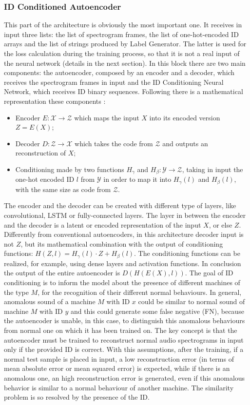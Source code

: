\subsubsection{ID Conditioned Autoencoder}
This part of the architecture is obviously the most important one. It receives in input three lists: the list of spectrogram frames, the list of one-hot-encoded ID arrays and the list of strings produced by Label Generator. The latter is used for the loss calculation during the training process, so that it is not a real input of the neural network (details in the next section). In this block there are two main components: the autoencoder, composed by an encoder and a decoder, which receives the spectrogram frames in input and the ID Conditioning Neural Network, which receives ID binary sequences. Following there is a mathematical representation these components \cite{18IDConditionedAutoEncoder}:
\begin{itemize}
    \item {Encoder $E: \mathcal{X} \rightarrow \mathcal{Z}$ which maps the input $X$ into its encoded version $Z = E(X)$;}
    \item {Decoder $D:  \mathcal{Z} \rightarrow \mathcal{X}$ which takes the code from $\mathcal{Z}$ and outputs an reconstruction of $X$; }
    \item {Conditioning made by two functions $H_\gamma$ and $H_\beta: \mathcal{Y} \rightarrow \mathcal{Z}$, taking in input the one-hot encoded ID $l$ from $\mathcal{Y}$ in order to map it into $H_\gamma(l)$ and $H_\beta(l)$, with the same size as code from $\mathcal{Z}$.}
\end{itemize}
The encoder and the decoder can be created with different type of layers, like convolutional, LSTM or fully-connected layers. The layer in between the encoder and the decoder is a latent or encoded representation of the input $X$, or else $Z$. Differently from conventional autoencoders, in this architecture decoder input is not $Z$, but its mathematical combination with the output of conditioning functions: $H(Z,l) = H_\gamma(l) \cdot Z + H_\beta(l)$. The conditioning functions can be realized, for example, using dense layers and activation functions. In conclusion the output of the entire autoencoder is $D(H(E(X),l))$. The goal of ID conditioning is to inform the model about the presence of different machines of the type $M$, for the recognition of their different normal behaviours. In general, anomalous sound of a machine $M$ with ID $x$ could be similar to normal sound of machine $M$ with ID $y$ and this could generate some false negative (FN), because the autoencoder is unable, in this case, to distinguish this anomalous behaviours from normal one on which it has been trained on. The key concept is that the autoencoder must be trained to reconstruct normal audio spectrograms in input only if the provided ID is correct. With this assumptions, after the training, if a normal test sample is placed in input, a low reconstruction error (in terms of mean absolute error or mean squared error) is expected, while if there is an anomalous one, an high  reconstruction error is generated, even if this anomalous behavior is similar to a normal behaviour of another machine. The similarity problem is so resolved by the presence of the ID. 
